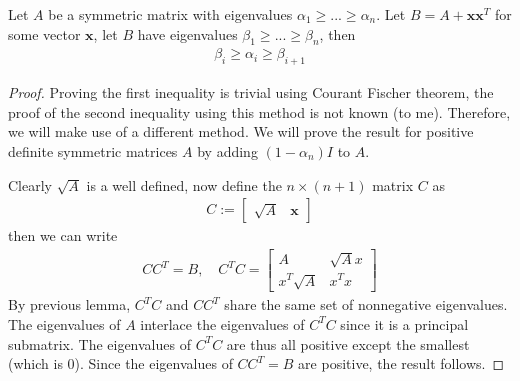 \documentclass{math}
\renewcommand{\vec}[1]{\boldsymbol{#1}}
\begin{document}
\begin{theorem}
    Let $A$ be a symmetric matrix with eigenvalues $\alpha_1 \geq ... \geq \alpha_n$.
    Let $B = A + \vec{x} \vec{x}^T$ for some vector $\vec{x}$, let $B$ have eigenvalues $\beta_1 \geq ... \geq \beta_n$, then
    \begin{align*}
        \beta_i \geq \alpha_i \geq \beta_{i + 1}
    \end{align*}
\end{theorem}
\begin{proof}
    Proving the first inequality is trivial using Courant Fischer theorem, the proof of the second inequality using this method is not known (to me).
    Therefore, we will make use of a different method.
    We will prove the result for positive definite symmetric matrices $A$ by adding $(1 - \alpha_n) I$ to $A$.

    Clearly $\sqrt{A}$ is a well defined, now define the $n \times (n + 1)$ matrix $C$ as
    \begin{align*}
        C := \begin{bmatrix}
            \sqrt{A} & \vec{x}
        \end{bmatrix}
    \end{align*}
    then we can write
    \begin{align*}
        CC^T = B, \quad C^T C = \begin{bmatrix}
            A & \sqrt{A}x \\
            x^T \sqrt{A} & x^T x
        \end{bmatrix}
    \end{align*}
    By previous lemma, $C^TC$ and $CC^T$ share the same set of nonnegative eigenvalues. The eigenvalues of $A$ interlace the eigenvalues of $C^T C$ since it is a principal submatrix.
    The eigenvalues of $C^TC$ are thus all positive except the smallest (which is $0$). Since the eigenvalues of $CC^T = B$ are positive, the result follows.
\end{proof}
\end{document}
